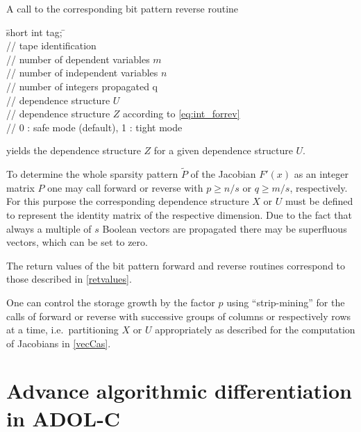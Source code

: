 \documentclass[11pt,twoside]{article}
\begin{document}
A call to the corresponding bit pattern {\sf reverse} routine
%
\begin{tabbing}
\hspace{0.5in}\={\sf short int tag;} \hspace{1.1in}\= \kill    %
\\
         \> // tape identification \\
                 \> // number of dependent variables $m$\\
                 \> // number of independent variables $n$\\
                 \> // number of integers propagated q\\
  \> // dependence structure $U$ \\
  \> // dependence structure $Z$ according
                                     to \eqref{eq:int_forrev}\\
        \> // 0 : safe mode (default), 1 : tight mode
\end{tabbing}
%
yields the dependence structure $Z$ for a given dependence structure
$U$.

To determine the whole sparsity pattern $\tilde{P}$ of the Jacobian $F'(x)$
as an integer matrix $P$ one may call {\sf forward} or {\sf reverse} 
with $p \ge n/s$ or $q \ge m/s$, respectively. For this purpose the 
corresponding dependence structure $X$ or $U$ must be defined to represent  
the identity matrix of the respective dimension.
Due to the fact that always a multiple of $s$ Boolean vectors are propagated
there may be superfluous vectors, which can be set to zero.

The return values of the bit pattern {\sf forward} and {\sf reverse} routines
correspond to those described in \autoref{retvalues}. 

One can control the storage growth by the factor $p$ using
``strip-mining'' for the calls of {\sf forward} or {\sf reverse} with successive
groups of columns or respectively rows at a time, i.e.~partitioning 
$X$ or $U$ appropriately as described for the computation of Jacobians 
in \autoref{vecCas}.
%
%
\section{Advance algorithmic differentiation in ADOL-C}
\label{adv_ad}
%
\end{document}
